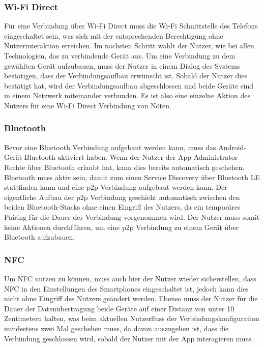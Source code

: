 		\subsubsection{Wi-Fi Direct} Für eine Verbindung über Wi-Fi Direct muss die Wi-Fi Schnittstelle des Telefons eingeschaltet sein, was sich mit der entsprechenden Berechtigung ohne Nutzerinteraktion erreichen. Im nächsten Schritt wählt der Nutzer, wie bei allen Technologien, das zu verbindende Gerät aus. Um eine Verbindung zu dem gewählten Gerät aufzubauen, muss der Nutzer in einem Dialog des Systems bestätigen, dass der Verbindungsaufbau erwünscht ist. Sobald der Nutzer dies bestätigt hat, wird der Verbindungsaufbau abgeschlossen und beide Geräte sind in einem Netzwerk miteinander verbunden. Es ist also eine einzelne Aktion des Nutzers für eine Wi-Fi Direct Verbindung von Nöten.
		
		\subsubsection{Bluetooth} Bevor eine Bluetooth Verbindung aufgebaut werden kann, muss das Android-Gerät Bluetooth aktiviert haben. Wenn der Nutzer der App Administrator Rechte über Bluetooth erlaubt hat, kann dies bereits automatisch geschehen. Bluetooth muss aktiv sein, damit zum einen Service Discovery über Bluetooth LE stattfinden kann und eine p2p Verbindung aufgebaut werden kann. Der eigentliche Aufbau der p2p Verbindung geschieht automatisch zwischen den beiden Bluetooth-Stacks ohne einen Eingriff des Nutzers, da  ein temporäres Pairing für die Dauer der Verbindung vorgenommen wird. Der Nutzer muss somit keine Aktionen durchführen, um eine p2p Verbindung zu einem Gerät über Bluetooth aufzubauen.
		
		\subsubsection{NFC} Um NFC nutzen zu können, muss auch hier der Nutzer wieder sicherstellen, dass NFC in den Einstellungen des Smartphones eingeschaltet ist, jedoch kann dies nicht ohne Eingriff des Nutzers geändert werden. Ebenso muss der Nutzer für die Dauer der Datenübertragung beide Geräte auf einer Distanz von unter 10 Zentimetern halten, was beim aktuellen Nutzerfluss der Verbindungskonfiguration mindestens zwei Mal geschehen muss, da davon auszugehen ist, dass die Verbindung geschlossen wird, sobald der Nutzer mit der App interagieren muss.
		
